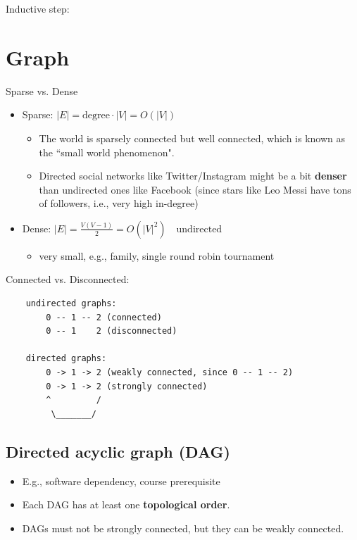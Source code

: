 \documentclass[12pt,a4paper]{article}
\begin{document}
Inductive step:

\section*{Graph}

Sparse vs. Dense

\begin{itemize}
    \item Sparse: $|E| = \text{degree} \cdot |V| = O(|V|)$
    \begin{itemize}
        \item The world is sparsely connected but well connected, which is known as the ``small world phenomenon". 
        \item Directed social networks like Twitter/Instagram might be a bit \textbf{denser} than undirected ones like Facebook (since stars like Leo Messi have tons of followers, i.e., very high in-degree)
    \end{itemize}
    \item Dense: $|E| = \frac{V(V-1)}{2} = O(|V|^2) \quad \text{undirected}$
    \begin{itemize}
        \item very small, e.g., family, single round robin tournament
    \end{itemize}
\end{itemize}

Connected vs. Disconnected:

\begin{verbatim}
    undirected graphs:
        0 -- 1 -- 2 (connected)
        0 -- 1    2 (disconnected)
    
    directed graphs:
        0 -> 1 -> 2 (weakly connected, since 0 -- 1 -- 2)
        0 -> 1 -> 2 (strongly connected)
        ^         /
         \_______/
\end{verbatim}

\subsection*{Directed acyclic graph (DAG)}

\begin{itemize}
    \item E.g., software dependency, course prerequisite
    \item Each DAG has at least one \textbf{topological order}.
    \item DAGs must not be strongly connected, but they can be weakly connected.
\end{itemize}
\end{document}
